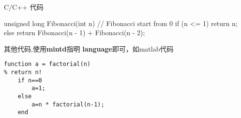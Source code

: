 C/C++ 代码
\begin{cppcode}
unsigned long Fibonacci(int n)
{
    // Fibonacci start from 0
    if (n <= 1) 
    {
        return n;
    }
    else 
    {
        return Fibonacci(n - 1) + Fibonacci(n - 2);
    }
}
\end{cppcode}

其他代码,使用\textbf{mintd}指明 \textbf{language}即可，如matlab代码

\begin{verbatim}
function a = factorial(n)
% return n!
    if n==0
        a=1;
    else
        a=n * factorial(n-1);
    end
\end{verbatim}